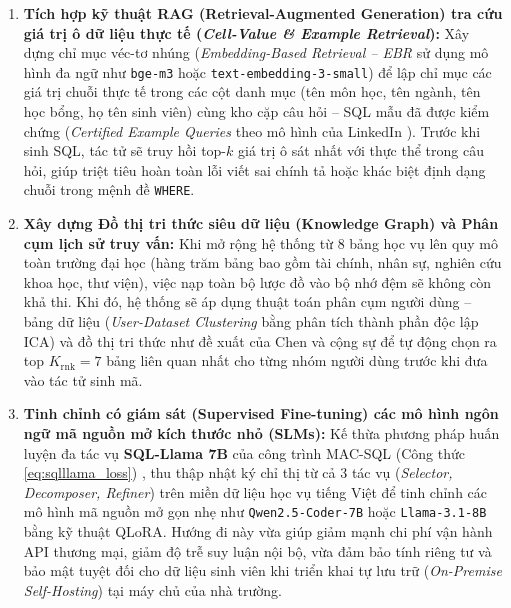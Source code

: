 \documentclass[12pt,a4paper]{report}
\begin{document}
\begin{enumerate}
    \item \textbf{Tích hợp kỹ thuật RAG (Retrieval-Augmented Generation) tra cứu giá trị ô dữ liệu thực tế (\textit{Cell-Value \& Example Retrieval}):} Xây dựng chỉ mục véc-tơ nhúng (\textit{Embedding-Based Retrieval -- EBR} sử dụng mô hình đa ngữ như \texttt{bge-m3} hoặc \texttt{text-embedding-3-small}) để lập chỉ mục các giá trị chuỗi thực tế trong các cột danh mục (tên môn học, tên ngành, tên học bổng, họ tên sinh viên) cùng kho cặp câu hỏi -- SQL mẫu đã được kiểm chứng (\textit{Certified Example Queries} theo mô hình của LinkedIn \cite{chen2025enterprise}). Trước khi sinh SQL, tác tử sẽ truy hồi top-$k$ giá trị ô sát nhất với thực thể trong câu hỏi, giúp triệt tiêu hoàn toàn lỗi viết sai chính tả hoặc khác biệt định dạng chuỗi trong mệnh đề \texttt{WHERE}.
    \item \textbf{Xây dựng Đồ thị tri thức siêu dữ liệu (Knowledge Graph) và Phân cụm lịch sử truy vấn:} Khi mở rộng hệ thống từ 8 bảng học vụ lên quy mô toàn trường đại học (hàng trăm bảng bao gồm tài chính, nhân sự, nghiên cứu khoa học, thư viện), việc nạp toàn bộ lược đồ vào bộ nhớ đệm sẽ không còn khả thi. Khi đó, hệ thống sẽ áp dụng thuật toán phân cụm người dùng -- bảng dữ liệu (\textit{User-Dataset Clustering} bằng phân tích thành phần độc lập ICA) và đồ thị tri thức như đề xuất của Chen và cộng sự \cite{chen2025enterprise} để tự động chọn ra top $K_{\text{rnk}} = 7$ bảng liên quan nhất cho từng nhóm người dùng trước khi đưa vào tác tử sinh mã.
    \item \textbf{Tinh chỉnh có giám sát (Supervised Fine-tuning) các mô hình ngôn ngữ mã nguồn mở kích thước nhỏ (SLMs):} Kế thừa phương pháp huấn luyện đa tác vụ \textbf{SQL-Llama 7B} của công trình MAC-SQL (Công thức \ref{eq:sqlllama_loss}) \cite{wang2025macsql}, thu thập nhật ký chỉ thị từ cả 3 tác vụ (\textit{Selector, Decomposer, Refiner}) trên miền dữ liệu học vụ tiếng Việt để tinh chỉnh các mô hình mã nguồn mở gọn nhẹ như \texttt{Qwen2.5-Coder-7B} hoặc \texttt{Llama-3.1-8B} bằng kỹ thuật QLoRA. Hướng đi này vừa giúp giảm mạnh chi phí vận hành API thương mại, giảm độ trễ suy luận nội bộ, vừa đảm bảo tính riêng tư và bảo mật tuyệt đối cho dữ liệu sinh viên khi triển khai tự lưu trữ (\textit{On-Premise Self-Hosting}) tại máy chủ của nhà trường.
\end{enumerate}

\newpage
{}


\end{document}

